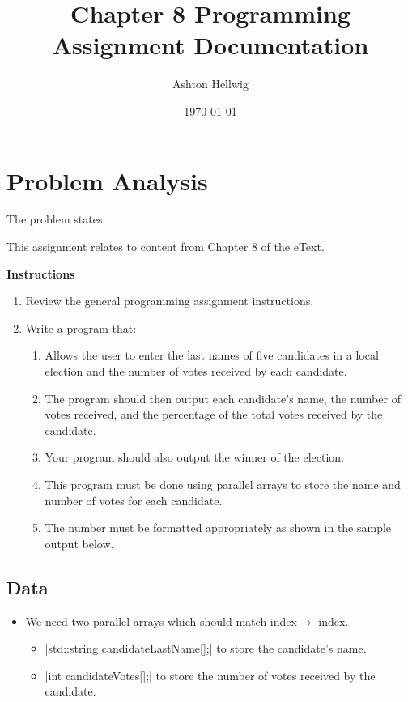 \documentclass[a4paper, 11pt]{article}
\title{Chapter 8 Programming Assignment Documentation}
\author{Ashton Hellwig}
\date\today
\theoremstyle{definition}
\theoremstyle{plain}
\begin{document}
  \maketitle
  \tableofcontents
  \listofalgorithms
  \lstlistoflistings
  \newpage


  \section{Problem Analysis}
    The problem states:
    \begin{mdframed}[backgroundcolor=green!20]
      This assignment relates to content from Chapter 8 of the eText.

      \textbf{Instructions}\vspace{-8pt}
      \begin{enumerate}
        \item Review the general programming assignment instructions.
        \item Write a program that:
          \begin{enumerate}[label=\Alph*.]
            \item Allows the user to enter the last names of five candidates in
              a local election and the number of votes received by each candidate.
            \item The program should then output each candidate’s name, the
              number of votes received, and the percentage of the total votes
              received by the candidate.
            \item Your program should also output the winner of the election.
            \item This program must be done using parallel arrays to store the
              name and number of votes for each candidate.
            \item The number must be formatted appropriately as shown in the
              sample output below.
          \end{enumerate}
      \end{enumerate}
    \end{mdframed}

    \subsection{Data}
      \begin{itemize}
        \item We need two parallel arrays which should match index$\rightarrow$%
          index.
          \begin{itemize}
            \item |std::string candidateLastName[];| to store the candidate's
              name.
            \item |int candidateVotes[];| to store the number of votes received
              by the candidate.
          \end{itemize}
      \end{itemize}
\end{document}
